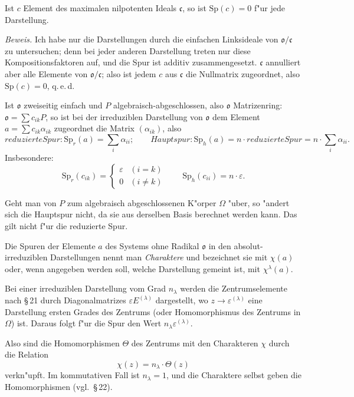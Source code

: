 \documentclass[12pt,a4paper]{article}
\theoremstyle{plain}
\newcommand{\Sp}{\mathrm{Sp}}
\begin{document}
Ist $c$ Element des maximalen nilpotenten Ideals $\mathfrak{c}$, so ist $\Sp(c) = 0$ f"ur jede Darstellung.

\noindent\textit{Beweis.}
Ich habe nur die Darstellungen durch die einfachen Linksideale von $\mathfrak{o}/\mathfrak{c}$ zu untersuchen; denn bei jeder anderen Darstellung treten nur diese Kompositionsfaktoren auf, und die Spur ist additiv zusammengesetzt. $\mathfrak{c}$ annulliert aber alle Elemente von $\mathfrak{o}/\mathfrak{c}$; also ist jedem $c$ aus $\mathfrak{c}$ die Nullmatrix zugeordnet, also $\Sp(c) = 0$, q.\,e.\,d.

Ist $\mathfrak{o}$ zweiseitig einfach und $P$ algebraisch-abgeschlossen, also $\mathfrak{o}$ Matrizenring: $\mathfrak{o} = \sum c_{ik}P$, so ist bei der irreduziblen Darstellung von $\mathfrak{o}$ dem Element $a = \sum c_{ik}\alpha_{ik}$ zugeordnet die Matrix $(\alpha_{ik})$, also
\[
{reduzierte Spur: } \Sp_r(a) = \sum_i \alpha_{ii};\qquad
{Hauptspur: } \Sp_h(a) = n \cdot {reduzierte Spur} = n \cdot \sum_i \alpha_{ii}.
\]
Insbesondere:
\[
\Sp_r(c_{ik}) = \begin{cases} \varepsilon & (i=k)\\ 0 & (i \neq k) \end{cases}
\qquad
\Sp_h(c_{ii}) = n \cdot \varepsilon.
\]

Geht man von $P$ zum algebraisch abgeschlossenen K"orper $\Omega$ "uber, so "andert sich die Hauptspur nicht, da sie aus derselben Basis berechnet werden kann. Das gilt nicht f"ur die reduzierte Spur.

Die Spuren der Elemente $a$ des Systems ohne Radikal $\mathfrak{o}$ in den absolut-irreduziblen Darstellungen nennt man \textit{Charaktere} und bezeichnet sie mit $\chi(a)$ oder, wenn angegeben werden soll, welche Darstellung gemeint ist, mit $\chi^\lambda(a)$.

Bei einer irreduziblen Darstellung vom Grad $n_\lambda$ werden die Zentrumselemente nach \S\,21 durch Diagonalmatrizes $\varepsilon E^{(\lambda)}$ dargestellt, wo $z \to \varepsilon^{(\lambda)}$ eine Darstellung ersten Grades des Zentrums (oder Homomorphismus des Zentrums in $\Omega$) ist. Daraus folgt f"ur die Spur den Wert $n_\lambda \varepsilon^{(\lambda)}$.

Also sind die Homomorphismen $\Theta$ des Zentrums mit den Charakteren $\chi$ durch die Relation
\[
\chi(z) = n_\lambda \cdot \Theta(z)\tag{1}
\]
verkn"upft. Im kommutativen Fall ist $n_\lambda = 1$, und die Charaktere selbst geben die Homomorphismen (vgl.\ \S\,22).
\end{document}

